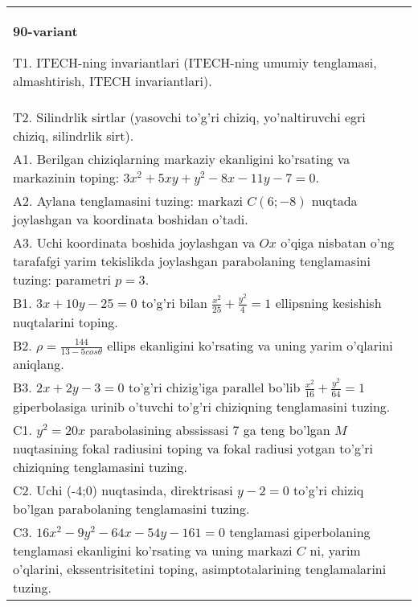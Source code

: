 \documentclass{article}
\begin{document}
\begin{tabular}{m{17cm}}
\textbf{90-variant}
\newline

T1. ITECH-ning invariantlari (ITECH-ning umumiy tenglamasi, almashtirish, ITECH invariantlari).\\

T2. Silindrlik sirtlar (yasovchi to'g'ri chiziq, yo'naltiruvchi egri chiziq, silindrlik sirt).\\

A1. Berilgan chiziqlarning markaziy ekanligini ko'rsating va markazinin toping: $3x^{2}+5xy+y^{2}-8x-11y-7=0$.\\

A2. Aylana tenglamasini tuzing: markazi $C(6;-8)$ nuqtada joylashgan va koordinata boshidan o'tadi.\\

A3. Uchi koordinata boshida joylashgan va $Ox$ o'qiga nisbatan o'ng tarafafgi yarim tekislikda joylashgan parabolaning tenglamasini tuzing: parametri $p=3$.\\

B1. $3x + 10y - 25 = 0$ to'g'ri bilan $\frac{x^{2}}{25} + \frac{y^{2}}{4} = 1$ ellipsning kesishish nuqtalarini toping.  \\

B2. $\rho = \frac{144}{13 - 5cos\theta}$ ellips ekanligini ko'rsating va uning yarim o'qlarini aniqlang.\\

B3. $2x + 2y - 3 = 0$ to'g'ri chizig'iga parallel bo'lib $\frac{x^{2}}{16} + \frac{y^{2}}{64} = 1$ giperbolasiga urinib o'tuvchi to'g'ri chiziqning tenglamasini tuzing.  \\

C1. $y^{2} = 20x$ parabolasining abssissasi 7 ga teng bo'lgan $M$ nuqtasining fokal radiusini toping va fokal radiusi yotgan to'g'ri chiziqning tenglamasini tuzing.  \\

C2. Uchi (-4;0) nuqtasinda, direktrisasi $y - 2 = 0$ to'g'ri chiziq bo'lgan parabolaning tenglamasini tuzing.\\

C3. $16x^{2} - 9y^{2} - 64x - 54y - 161 = 0$ tenglamasi giperbolaning tenglamasi ekanligini ko'rsating va uning markazi $C$ ni, yarim o'qlarini, ekssentrisitetini toping, asimptotalarining tenglamalarini tuzing.  \\

\end{tabular}
\vspace{1cm}
\end{document}

